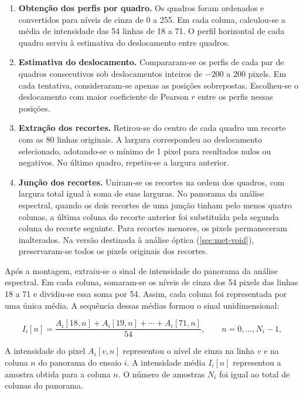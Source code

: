 \begin{enumerate}
  \item \textbf{Obtenção dos perfis por quadro.} Os quadros foram ordenados
  e convertidos para níveis de cinza de 0 a 255. Em cada coluna, calculou-se
  a média de intensidade das 54 linhas de 18 a 71. O perfil horizontal de
  cada quadro serviu à estimativa do deslocamento entre quadros.
  \item \textbf{Estimativa do deslocamento.} Compararam-se os
  perfis de cada par de quadros consecutivos sob deslocamentos inteiros de
  $-200$ a $200$ pixels. Em cada tentativa, consideraram-se apenas as
  posições sobrepostas. Escolheu-se o deslocamento com maior coeficiente
  de Pearson $r$ entre os perfis nessas posições.
  \item \textbf{Extração dos recortes.} Retirou-se do centro de cada quadro
  um recorte com as 80 linhas originais. A largura correspondeu ao
  deslocamento selecionado, adotando-se o mínimo de 1 pixel para resultados
  nulos ou negativos. No último quadro, repetiu-se a largura anterior.
  \item \textbf{Junção dos recortes.} Uniram-se os recortes na ordem dos
  quadros, com largura total igual à soma de suas larguras. No panorama
  da análise espectral, quando os dois recortes de uma junção tinham pelo
  menos quatro colunas, a última coluna do recorte anterior foi substituída
  pela segunda coluna do recorte seguinte. Para recortes menores, os pixels
  permaneceram inalterados. Na versão destinada à análise óptica
  (\autoref{sec:met-void}), preservaram-se todos os pixels originais dos recortes.
\end{enumerate}

Após a montagem, extraiu-se o sinal de intensidade do panorama da análise
espectral. Em cada coluna, somaram-se os níveis de cinza dos 54 pixels
das linhas 18 a 71 e dividiu-se essa soma por 54. Assim, cada coluna foi
representada por uma única média. A sequência dessas médias formou o
sinal unidimensional:\nopagebreak[4]

\begin{equation}\label{eq:met-extracao}
  I_i[n]=\frac{A_i[18,n]+A_i[19,n]+\cdots+A_i[71,n]}{54},
  \qquad n=0,\ldots,N_i-1,
\end{equation}

\noindent
A intensidade do pixel $A_i[v,n]$ representou o nível de cinza na linha $v$
e na coluna $n$ do panorama do ensaio $i$. A intensidade média $I_i[n]$
representou a amostra obtida para a coluna $n$. O número de amostras $N_i$
foi igual ao total de colunas do panorama.

